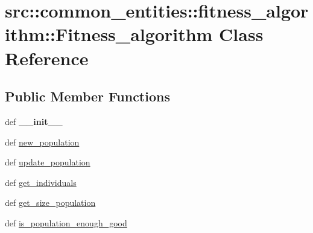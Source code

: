 \hypertarget{classsrc_1_1common__entities_1_1fitness__algorithm_1_1Fitness__algorithm}{
\section{src::common\_\-entities::fitness\_\-algorithm::Fitness\_\-algorithm Class Reference}
\label{classsrc_1_1common__entities_1_1fitness__algorithm_1_1Fitness__algorithm}
}
\subsection*{Public Member Functions}
\begin{DoxyCompactItemize}
\item 
\hypertarget{classsrc_1_1common__entities_1_1fitness__algorithm_1_1Fitness__algorithm_ab9ca5bed75544722fbe518d8066cfec9}{
def {\bfseries \_\-\_\-init\_\-\_\-}}
\label{classsrc_1_1common__entities_1_1fitness__algorithm_1_1Fitness__algorithm_ab9ca5bed75544722fbe518d8066cfec9}

\item 
def \hyperlink{classsrc_1_1common__entities_1_1fitness__algorithm_1_1Fitness__algorithm_ab8e8b03fd53c8155f2954400ace1107c}{new\_\-population}
\item 
def \hyperlink{classsrc_1_1common__entities_1_1fitness__algorithm_1_1Fitness__algorithm_af6034a8f7c77bb744a6b88095f0f022f}{update\_\-population}
\item 
def \hyperlink{classsrc_1_1common__entities_1_1fitness__algorithm_1_1Fitness__algorithm_aa524bffdef272f41f4f348719a005e46}{get\_\-individuals}
\item 
def \hyperlink{classsrc_1_1common__entities_1_1fitness__algorithm_1_1Fitness__algorithm_a506f0b8de09417c6cc9d90daa5e00cab}{get\_\-size\_\-population}
\item 
def \hyperlink{classsrc_1_1common__entities_1_1fitness__algorithm_1_1Fitness__algorithm_a6efae0d4048074eeaa360e1745390fc2}{is\_\-population\_\-enough\_\-good}
\end{DoxyCompactItemize}


